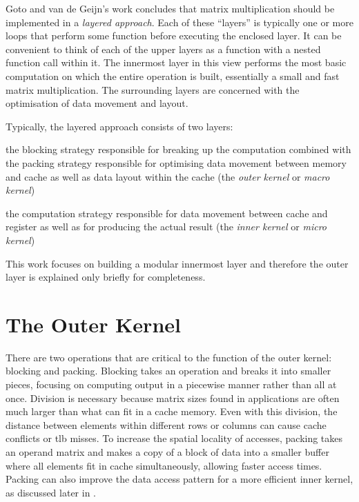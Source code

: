 \documentclass[\main/thesis.tex]{subfiles}
\begin{document}
Goto and van de Geijn's work concludes that matrix multiplication should be implemented in a \emph{layered approach}.
Each of these ``layers'' is typically one or more loops that perform some function before executing the enclosed layer.
It can be convenient to think of each of the upper layers as a function with a nested function call within it.
The innermost layer in this view performs the most basic computation on which the entire operation is built, essentially a small and fast matrix multiplication.
The surrounding layers are concerned with the optimisation of data movement and layout.

Typically, the layered approach consists of two layers:
\begin{enumerate*}[itemjoin={{; }}, itemjoin*={{; and }}, label=\textbf{(\arabic*)}, after={.}]
  \item the blocking strategy responsible for breaking up the computation combined with the packing strategy responsible for optimising data movement between memory and cache as well as data layout within the cache (the \emph{outer kernel} or \emph{macro kernel})
  \item the computation strategy responsible for data movement between cache and register as well as for producing the actual result (the \emph{inner kernel} or \emph{micro kernel})
\end{enumerate*}
This work focuses on building a modular innermost layer and therefore the outer layer is explained only briefly for completeness.

\section{The Outer Kernel}
\label{sec:outerKernel}
There are two operations that are critical to the function of the outer kernel: blocking and packing.
Blocking takes an operation and breaks it into smaller pieces, focusing on computing output in a piecewise manner rather than all at once.
Division is necessary because matrix sizes found in applications are often much larger than what can fit in a cache memory.
Even with this division, the distance between elements within different rows or columns can cause cache conflicts or \gls{tlb} misses.
To increase the spatial locality of accesses, packing takes an operand matrix and makes a copy of a block of data into a smaller buffer where all elements fit in cache simultaneously, allowing faster access times.
Packing can also improve the data access pattern for a more efficient inner kernel, as discussed later in .
\end{document}
